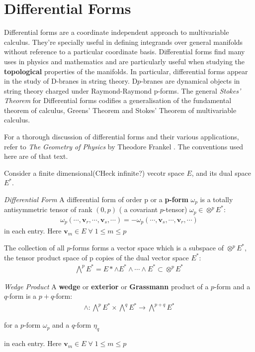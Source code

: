 \chapter{Differential Forms} \label{infoparadox}
Differential forms are a coordinate independent approach to multivariable calculus. They're specially useful in defining integrands over general manifolds without reference to a particular coordinate basis. Differential forms find many uses in physics and mathematics and are particularly useful when studying the \textbf{topological} properties of the manifolds. In particular, differential forms appear in the study of D-branes in string theory. D$p$-branes are dynamical objects in string theory charged under Raymond-Raymond p-forms. The general \emph{Stokes' Theorem} for Differential forms codifies a generalisation of the fundamental theorem of calculus, Greens' Theorem and Stokes' Theorem of multivariable calculus.


For a thorough discussion of differential forms and their various applications, refer to \emph{The Geometry of Physics} by Theodore Frankel \cite{frankel2004geometry}. The conventions used here are of that text.

Consider a finite dimensional(CHeck infinite?) vecotr space $E$, and its dual space $E^*$.  
\begin{definition}{\emph{Differential Form}}
A differential form of order p or a \textbf{p-form} $\omega_p$ is a totally antisymmetric tensor of rank $(0,p)$ ( a covariant $p$-tensor) $\omega_p \in \otimes^p E^*$:
\begin{align}
 \omega_p(\cdots,\bm{v}_r,\cdots,\bm{v}_s,\cdots) = -\omega_p(\cdots,\bm{v}_s,\cdots,\bm{v}_r,\cdots)
\end{align}
in each entry. Here $\bm{v}_m \in E \; \forall \; 1 \leq m \leq p$ 
\end{definition}

The collection of all $p$-forms forms a vector space which is a subspace of $\otimes^p E^*$, the tensor product space of p copies of the dual vector space $E^*$:
\begin{align}
 \bigwedge^p E^* = E* \wedge E^* \wedge \cdots \wedge E^* \subset  \otimes^p E^*
\end{align}

\begin{definition}{\emph{Wedge Product}}
A \textbf{wedge} or \textbf{exterior} or \textbf{Grassmann} product of a $p$-form and a $q$-form is a $p+q$-form: 
\begin{align}
 \wedge : \bigwedge^p E^* \times \bigwedge^q E^* \to \bigwedge^{p+q}E^*
\end{align}

for a $p$-form $\omega_p$ and a $q$-form $\eta_q$ 

in each entry. Here $\bm{v}_m \in E \; \forall \; 1 \leq m \leq p$ 
\end{definition}
